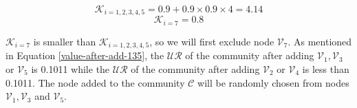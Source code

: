 \documentclass[\main/thesis.tex]{subfiles}
\begin{document}
\begin{equation}
\mathcal{K}_{i=1,2,3,4,5}=0.9+0.9\times0.9\times4=4.14
\end{equation}
\begin{equation}
\mathcal{K}_{i=7}=0.8
\end{equation}

$\mathcal{K}_{i=7}$ is smaller than $\mathcal{K}_{i=1,2,3,4,5}$, so we will first exclude node $\mathcal{V}_7$. As mentioned in Equation \ref{value-after-add-135}, the $\mathcal{UR}$ of the community after adding $\mathcal{V}_1, \mathcal{V}_3$ or $\mathcal{V}_5$ is 0.1011 while the $\mathcal{UR}$ of the community after adding $\mathcal{V}_2$ or $\mathcal{V}_4$ is less than 0.1011. The node added to the community $\mathcal{C}$ will be randomly chosen from nodes $\mathcal{V}_1, \mathcal{V}_3$ and $\mathcal{V}_5$.
\end{document}
